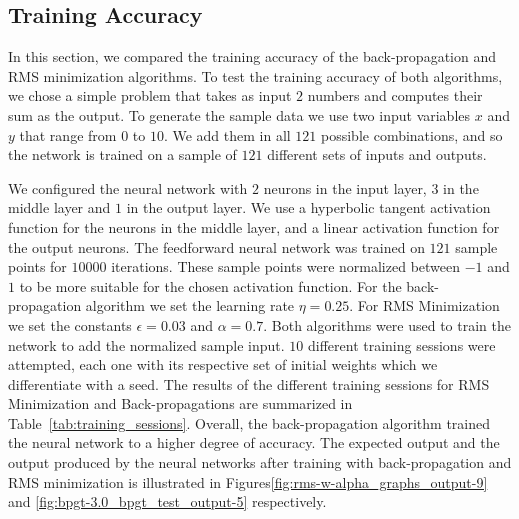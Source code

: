 \documentclass[11pt]{article}
\begin{document}
\subsection{Training Accuracy} %
\label{sub:training_accuracy}

In this section, we compared the training accuracy of the back-propagation and RMS minimization algorithms. To test the training accuracy
of both algorithms, we chose a simple problem that takes as input $2$ numbers and computes their sum as the output. To generate the
sample data we use two input variables $x$ and $y$ that range from $0$ to $10$. We add them in all $121$ possible combinations, and so
the network is trained on a sample of $121$ different sets of inputs and outputs.

We configured the neural network with $2$ neurons in the input layer, $3$ in the middle layer and $1$ in the output layer. We use a
hyperbolic tangent activation function for the neurons in the middle layer, and a linear activation function for the output neurons. The
feedforward neural network was trained on $121$ sample points for $10000$ iterations. These sample points were normalized between $-1$
and $1$ to be more suitable for the chosen activation function. For the back-propagation algorithm we set the learning rate $\eta=0.25$.
For RMS Minimization we set the constants $\epsilon=0.03$ and $\alpha=0.7$. Both algorithms were used to train the network to add the
normalized sample input. $10$ different training sessions were attempted, each one with its respective set of initial weights which we
differentiate with a seed. The results of the different training sessions for RMS Minimization and Back-propagations are summarized in
Table~\ref{tab:training_sessions}. Overall, the back-propagation algorithm trained the neural network to a higher degree of accuracy.
The expected output and the output produced by the neural networks after training with back-propagation and RMS minimization is
illustrated in Figures\ref{fig:rms-w-alpha_graphs_output-9} and \ref{fig:bpgt-3.0_bpgt_test_output-5} respectively.
\end{document}
